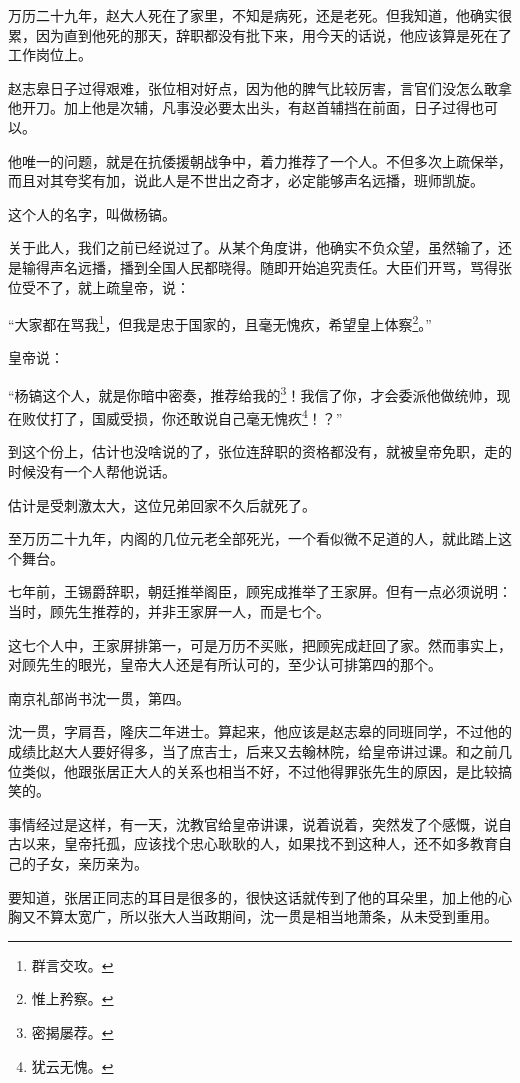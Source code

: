 \begin{multicols}{\theparacolNo}
万历二十九年，赵大人死在了家里，不知是病死，还是老死。但我知道，他确实很累，因为直到他死的那天，辞职都没有批下来，用今天的话说，他应该算是死在了工作岗位上。

赵志皋日子过得艰难，张位相对好点，因为他的脾气比较厉害，言官们没怎么敢拿他开刀。加上他是次辅，凡事没必要太出头，有赵首辅挡在前面，日子过得也可以。

他唯一的问题，就是在抗倭援朝战争中，着力推荐了一个人。不但多次上疏保举，而且对其夸奖有加，说此人是不世出之奇才，必定能够声名远播，班师凯旋。

这个人的名字，叫做杨镐。

关于此人，我们之前已经说过了。从某个角度讲，他确实不负众望，虽然输了，还是输得声名远播，播到全国人民都晓得。随即开始追究责任。大臣们开骂，骂得张位受不了，就上疏皇帝，说：

“大家都在骂我\footnote{群言交攻。}，但我是忠于国家的，且毫无愧疚，希望皇上体察\footnote{惟上矜察。}。”

皇帝说：

“杨镐这个人，就是你暗中密奏，推荐给我的\footnote{密揭屡荐。}！我信了你，才会委派他做统帅，现在败仗打了，国威受损，你还敢说自己毫无愧疚\footnote{犹云无愧。}！？”

到这个份上，估计也没啥说的了，张位连辞职的资格都没有，就被皇帝免职，走的时候没有一个人帮他说话。

估计是受刺激太大，这位兄弟回家不久后就死了。

至万历二十九年，内阁的几位元老全部死光，一个看似微不足道的人，就此踏上这个舞台。

七年前，王锡爵辞职，朝廷推举阁臣，顾宪成推举了王家屏。但有一点必须说明：当时，顾先生推荐的，并非王家屏一人，而是七个。

这七个人中，王家屏排第一，可是万历不买账，把顾宪成赶回了家。然而事实上，对顾先生的眼光，皇帝大人还是有所认可的，至少认可排第四的那个。

南京礼部尚书沈一贯，第四。

沈一贯，字肩吾，隆庆二年进士。算起来，他应该是赵志皋的同班同学，不过他的成绩比赵大人要好得多，当了庶吉士，后来又去翰林院，给皇帝讲过课。和之前几位类似，他跟张居正大人的关系也相当不好，不过他得罪张先生的原因，是比较搞笑的。

事情经过是这样，有一天，沈教官给皇帝讲课，说着说着，突然发了个感慨，说自古以来，皇帝托孤，应该找个忠心耿耿的人，如果找不到这种人，还不如多教育自己的子女，亲历亲为。

要知道，张居正同志的耳目是很多的，很快这话就传到了他的耳朵里，加上他的心胸又不算太宽广，所以张大人当政期间，沈一贯是相当地萧条，从未受到重用。


\end{multicols}
